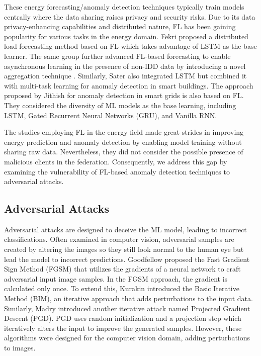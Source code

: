 These energy forecasting/anomaly detection techniques typically train models centrally where the data sharing raises privacy and security risks. Due to its data privacy-enhancing capabilities and distributed nature, FL has been gaining popularity for various tasks in the energy domain. Fekri \etal \cite{DistributedLoad2022} proposed a distributed load forecasting method based on FL which takes advantage of LSTM as the base learner. The same group further advanced FL-based forecasting to enable asynchronous learning in the presence of non-IDD data by introducing a novel aggregation technique \cite{AsynchronousFL}. Similarly, Sater \etal \cite{Sater2020AFL} also integrated LSTM but combined it with multi-task learning for anomaly detection in smart buildings. The approach proposed by Jithish \etal \cite{jithish2023distributed} for anomaly detection in smart grids is also based on FL. They considered the diversity of ML models as the base learning, including LSTM, Gated Recurrent Neural Networks (GRU), and Vanilla RNN. 

The studies employing FL in the energy field made great strides in improving energy prediction and anomaly detection by enabling model training without sharing raw data. Nevertheless, they did not consider the possible presence of malicious clients in the federation. Consequently, we address this gap by examining the vulnerability of FL-based anomaly detection techniques to adversarial attacks.

\subsection{Adversarial Attacks}
\label{sub_sec:AdversarialAttack}

Adversarial attacks are designed to deceive the ML model, leading to incorrect classifications. Often examined in computer vision, adversarial samples are created by altering the images so they still look normal to the human eye but lead the model to incorrect predictions. Goodfellow \etal \cite{goodfellow2014explaining} proposed the Fast Gradient Sign Method (FGSM) that utilizes the gradients of a neural network to craft adversarial input image samples. In the FGSM approach, the gradient is calculated only once. To extend this, Kurakin \etal \cite{kurakin2017adversarial} introduced the Basic Iterative Method (BIM), an iterative approach that adds perturbations to the input data. Similarly, Madry \etal \cite{madry2017towards} introduced another iterative attack named Projected Gradient Descent (PGD). PGD uses random initialization and a projection step which iteratively alters the input to improve the generated samples. However, these algorithms were designed for the computer vision domain, adding perturbations to images.

